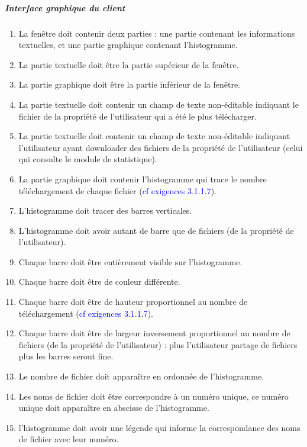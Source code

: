 \documentclass[10pt,a4paper]{report}
\begin{document}
	\subparagraph{Interface graphique du client}
		\begin{enumerate}

			\item La fenêtre doit contenir deux parties : une partie contenant les informations textuelles, et une partie graphique contenant l'histogramme.

			\item La partie textuelle doit être la partie supérieur de la fenêtre.

			\item La partie graphique doit être la partie inférieur de la fenêtre.

			\item La partie textuelle doit contenir un champ de texte non-éditable indiquant le fichier de la propriété de l'utilisateur qui a été le plus télécharger.

			\item La partie textuelle doit contenir un champ de texte non-éditable indiquant l'utilisateur ayant downloader des fichiers de la propriété de l'utilisateur (celui qui consulte le module de statistique).

			\item La partie graphique doit contenir l'histogramme qui trace le nombre téléchargement de chaque fichier (\textcolor{blue}{cf exigences 3.1.1.7}).

			\item L'histogramme doit tracer des barres verticales.

			\item L'histogramme doit avoir autant de barre que de fichiers (de la propriété de l'utilisateur).

			\item Chaque barre doit être entièrement visible sur l'histogramme.

			\item Chaque barre doit être de couleur différente.

			\item Chaque barre doit être de hauteur proportionnel au nombre de téléchargement (\textcolor{blue}{cf exigences 3.1.1.7}).

			\item Chaque barre doit être de largeur inversement proportionnel au nombre de fichiers (de la propriété de l'utilisateur) : plus l'utilisateur partage de fichiers plus les barres seront fine.

			\item Le nombre de fichier doit apparaître en ordonnée de l'histogramme.

			\item Les noms de fichier doit être correspondre à un numéro unique, ce numéro unique doit apparaître en abscisse de l'histogramme.

			\item l'histogramme doit avoir une légende qui informe la correspondance des noms de fichier avec leur numéro.
		\end{enumerate}
\end{document}
